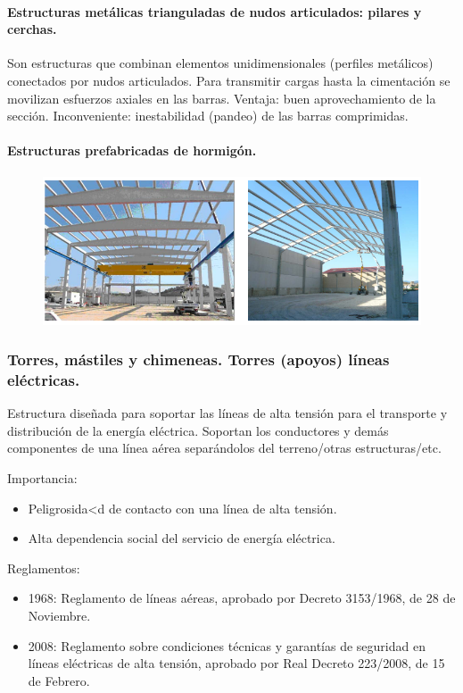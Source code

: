 \paragraph{Estructuras metálicas trianguladas de nudos articulados: pilares y cerchas.}
Son estructuras que combinan elementos unidimensionales (perfiles metálicos) conectados por nudos articulados. Para transmitir cargas hasta la cimentación se movilizan esfuerzos axiales en las barras. Ventaja: buen aprovechamiento de la sección. Inconveniente: inestabilidad (pandeo) de las barras comprimidas.

\paragraph{Estructuras prefabricadas de hormigón.}

\begin{figure}[H]
    \centering
    \includegraphics[width=1\linewidth]{Imagenes/Est prefabricadas de hormigon.png}
\end{figure}

\subsubsection{Torres, mástiles y chimeneas. Torres (apoyos) líneas eléctricas.}
Estructura diseñada para soportar las líneas de alta tensión para el transporte y distribución de la energía eléctrica. Soportan los conductores y demás componentes de una línea aérea separándolos del terreno/otras estructuras/etc.

Importancia:
\begin{itemize}
    \item Peligrosida<d de contacto con una línea de alta tensión.
    \item Alta dependencia social del servicio de energía eléctrica.
\end{itemize}

Reglamentos:
\begin{itemize}
    \item 1968: Reglamento de líneas aéreas, aprobado por Decreto 3153/1968, de 28 de Noviembre.
    \item 2008: Reglamento sobre condiciones técnicas y garantías de seguridad en líneas eléctricas de alta tensión, aprobado por Real Decreto 223/2008, de 15 de Febrero.
\end{itemize}

